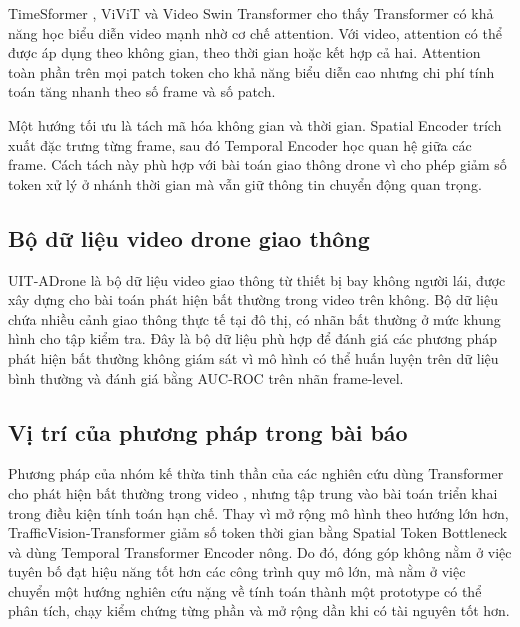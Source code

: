 TimeSformer \cite{c3}, ViViT \cite{c4} và Video Swin Transformer \cite{c11} cho thấy Transformer có khả năng học biểu diễn video mạnh nhờ cơ chế attention. Với video, attention có thể được áp dụng theo không gian, theo thời gian hoặc kết hợp cả hai. Attention toàn phần trên mọi patch token cho khả năng biểu diễn cao nhưng chi phí tính toán tăng nhanh theo số frame và số patch.

Một hướng tối ưu là tách mã hóa không gian và thời gian. Spatial Encoder trích xuất đặc trưng từng frame, sau đó Temporal Encoder học quan hệ giữa các frame. Cách tách này phù hợp với bài toán giao thông drone vì cho phép giảm số token xử lý ở nhánh thời gian mà vẫn giữ thông tin chuyển động quan trọng.

\subsection{Bộ dữ liệu video drone giao thông}

UIT-ADrone \cite{c2} là bộ dữ liệu video giao thông từ thiết bị bay không người lái, được xây dựng cho bài toán phát hiện bất thường trong video trên không. Bộ dữ liệu chứa nhiều cảnh giao thông thực tế tại đô thị, có nhãn bất thường ở mức khung hình cho tập kiểm tra. Đây là bộ dữ liệu phù hợp để đánh giá các phương pháp phát hiện bất thường không giám sát vì mô hình có thể huấn luyện trên dữ liệu bình thường và đánh giá bằng AUC-ROC trên nhãn frame-level.

\subsection{Vị trí của phương pháp trong bài báo}

Phương pháp của nhóm kế thừa tinh thần của các nghiên cứu dùng Transformer cho phát hiện bất thường trong video \cite{c3,c10,c12}, nhưng tập trung vào bài toán triển khai trong điều kiện tính toán hạn chế. Thay vì mở rộng mô hình theo hướng lớn hơn, TrafficVision-Transformer giảm số token thời gian bằng Spatial Token Bottleneck và dùng Temporal Transformer Encoder nông. Do đó, đóng góp không nằm ở việc tuyên bố đạt hiệu năng tốt hơn các công trình quy mô lớn, mà nằm ở việc chuyển một hướng nghiên cứu nặng về tính toán thành một prototype có thể phân tích, chạy kiểm chứng từng phần và mở rộng dần khi có tài nguyên tốt hơn.
